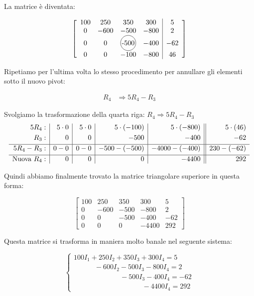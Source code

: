 La matrice è diventata:

\begin{equation}
\left[
\begin{array}{cccc|c}
100 & 250 & 350 & 300 & 5 \\
0   & -600 & -500 & -800 & 2 \\
0   & 0 & \tikz[baseline=(char.base)]{\node[draw,circle,inner sep=1pt] (char) {-500};} & -400 & -62 \\
0   & 0  & -100  & -800  & 46
\end{array}
\right]
\label{mat: dopo secondo pivot}
\end{equation}

Ripetiamo per l'ultima volta lo stesso procedimento per annullare gli elementi sotto il nuovo pivot:

\begin{equation}
\begin{aligned}
R_4 &\Rightarrow 5 R_4 - R_3
\end{aligned}
\end{equation}


Svolgiamo la trasformazione della quarta riga: $R_4 \Rightarrow 5R_4 - R_3$
\[
\begin{array}{r | r | r | r | r || r}
5R_4: & 5\cdot0 & 5\cdot0 & 5\cdot(-100) & 5\cdot(-800) & 5\cdot(46) \\[1mm]
R_3: & 0 & 0 & -500 & -400 & -62 \\[1mm]
\hline
5R_4 - R_3: & 0-0 & 0-0 & -500-(-500) & -4000-(-400) & 230-(-62) \\[1mm]
\hline
\text{Nuova }R_4: & 0 & 0 & 0 & -4400 & 292
\end{array}
\]

Quindi abbiamo finalmente trovato la matrice triangolare superiore in questa forma:

\begin{equation}
	\left[
		\begin{array}{cccc|c}
		100 & 250 & 350 & 300 & 5 \\
		0   & -600 & -500 & -800 & 2 \\
		0   & 0 & -500 & -400 & -62 \\
		0   & 0  & 0  & -4400  & 292
		\end{array}
	\right]
\end{equation}

Questa matrice si trasforma in maniera molto banale nel seguente sistema:

\begin{equation}
    \begin{cases}
	100I_1+250I_2+350I_3+300I_4 = 5\\
	\quad\qquad-600I_2-500I_3-800I_4 = 2\\
	\,\,\,\,\qquad\qquad\qquad-500I_3-400I_4=-62\\
	\qquad\qquad\qquad\qquad\quad\,\,\,\,\,-4400I_4=292
    \end{cases}
	\label{eq: sistema ridotto a gradini}
\end{equation}

